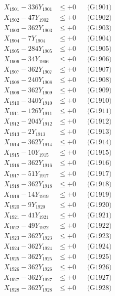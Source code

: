 \documentclass[a4paper,10pt]{article}
\begin{document}
{\begin{align}
\allowbreak
X_{1901} - 336Y_{1901} &\leq +0 && \text{(G1901)} \\
X_{1902} - 47Y_{1902} &\leq +0 && \text{(G1902)} \\
X_{1903} - 362Y_{1903} &\leq +0 && \text{(G1903)} \\
X_{1904} - 7Y_{1904} &\leq +0 && \text{(G1904)} \\
X_{1905} - 284Y_{1905} &\leq +0 && \text{(G1905)} \\
X_{1906} - 34Y_{1906} &\leq +0 && \text{(G1906)} \\
X_{1907} - 362Y_{1907} &\leq +0 && \text{(G1907)} \\
X_{1908} - 240Y_{1908} &\leq +0 && \text{(G1908)} \\
X_{1909} - 362Y_{1909} &\leq +0 && \text{(G1909)} \\
X_{1910} - 340Y_{1910} &\leq +0 && \text{(G1910)} \\
\allowbreak
X_{1911} - 126Y_{1911} &\leq +0 && \text{(G1911)} \\
X_{1912} - 204Y_{1912} &\leq +0 && \text{(G1912)} \\
X_{1913} - 2Y_{1913} &\leq +0 && \text{(G1913)} \\
X_{1914} - 362Y_{1914} &\leq +0 && \text{(G1914)} \\
X_{1915} - 10Y_{1915} &\leq +0 && \text{(G1915)} \\
X_{1916} - 362Y_{1916} &\leq +0 && \text{(G1916)} \\
X_{1917} - 51Y_{1917} &\leq +0 && \text{(G1917)} \\
X_{1918} - 362Y_{1918} &\leq +0 && \text{(G1918)} \\
X_{1919} - 14Y_{1919} &\leq +0 && \text{(G1919)} \\
X_{1920} - 9Y_{1920} &\leq +0 && \text{(G1920)} \\
\allowbreak
X_{1921} - 41Y_{1921} &\leq +0 && \text{(G1921)} \\
X_{1922} - 49Y_{1922} &\leq +0 && \text{(G1922)} \\
X_{1923} - 362Y_{1923} &\leq +0 && \text{(G1923)} \\
X_{1924} - 362Y_{1924} &\leq +0 && \text{(G1924)} \\
X_{1925} - 362Y_{1925} &\leq +0 && \text{(G1925)} \\
X_{1926} - 362Y_{1926} &\leq +0 && \text{(G1926)} \\
X_{1927} - 362Y_{1927} &\leq +0 && \text{(G1927)} \\
X_{1928} - 362Y_{1928} &\leq +0 && \text{(G1928)} \\

\end{align}}
\end{document}
